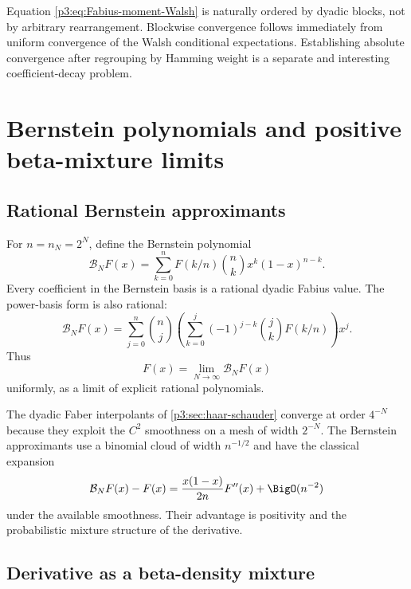 \documentclass[11pt]{article}
\theoremstyle{definition}
\theoremstyle{remark}
\begin{document}
\begin{remark}
Equation \eqref{p3:eq:Fabius-moment-Walsh} is naturally ordered by dyadic blocks,
not by arbitrary rearrangement.  Blockwise convergence follows immediately
from uniform convergence of the Walsh conditional expectations.  Establishing
absolute convergence after regrouping by Hamming weight is a separate and
interesting coefficient-decay problem.
\end{remark}

\section{Bernstein polynomials and positive beta-mixture limits}
\label{p3:sec:bernstein}

\subsection{Rational Bernstein approximants}

For $n=n_N=2^N$, define the Bernstein polynomial
\begin{equation}\label{p3:eq:Bernstein-F}
 \mathcal B_NF(x)
 =\sum_{k=0}^{n}F(k/n)\binom nkx^k(1-x)^{n-k}.
\end{equation}
Every coefficient in the Bernstein basis is a rational dyadic Fabius value.
The power-basis form is also rational:
\begin{equation}\label{p3:eq:Bernstein-power-basis}
 \mathcal B_NF(x)
 =\sum_{j=0}^{n}\binom nj
 \left(\sum_{k=0}^j(-1)^{j-k}\binom jkF(k/n)\right)x^j.
\end{equation}
Thus
\begin{equation}\label{p3:eq:F-Bernstein-limit}
 F(x)=\lim_{N\to\infty}\mathcal B_NF(x)
\end{equation}
uniformly, as a limit of explicit rational polynomials.

The dyadic Faber interpolants of \cref{p3:sec:haar-schauder} converge at order
$4^{-N}$ because they exploit the $C^2$ smoothness on a mesh of width $2^{-N}$.
The Bernstein approximants use a binomial cloud of width $n^{-1/2}$ and have the
classical expansion
\begin{equation}\label{p3:eq:Voronovskaya}
 \mathcal B_NF(x)-F(x)
 =\frac{x(1-x)}{2n}F''(x)+\BigO(n^{-2})
\end{equation}
under the available smoothness.  Their advantage is positivity and the
probabilistic mixture structure of the derivative.

\subsection{Derivative as a beta-density mixture}
\end{document}
